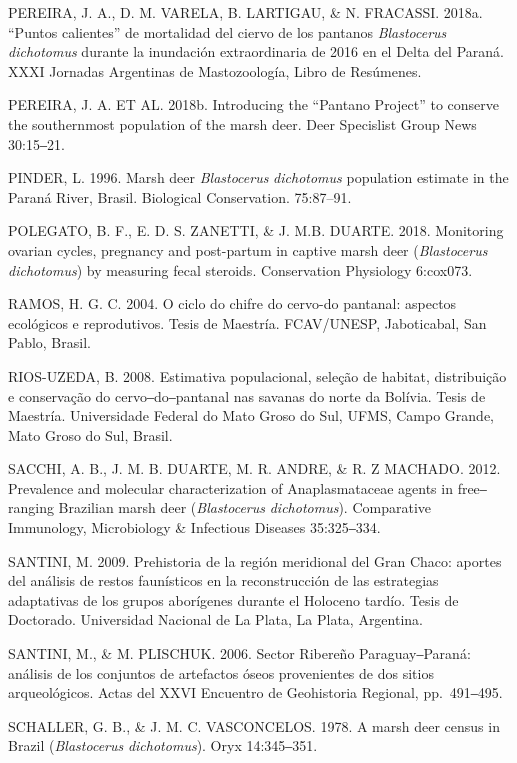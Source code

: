 \documentclass[
  x11names]{article}
\begin{document}
PEREIRA, J. A., D. M. VARELA, B. LARTIGAU, \& N. FRACASSI. 2018a.
``Puntos calientes'' de mortalidad del ciervo de los pantanos
\textit{Blastocerus} \textit{dichotomus} durante la inundación
extraordinaria de 2016 en el Delta del Paraná. XXXI Jornadas Argentinas
de Mastozoología, Libro de Resúmenes.

PEREIRA, J. A. ET AL. 2018b. Introducing the ``Pantano Project'' to
conserve the southernmost population of the marsh deer. Deer Specislist
Group News 30:15‒21.

PINDER, L. 1996. Marsh deer \textit{Blastocerus} \textit{dichotomus}
population estimate in the Paraná River, Brasil. Biological
Conservation. 75:87--91.

POLEGATO, B. F., E. D. S. ZANETTI, \& J. M.B. DUARTE. 2018. Monitoring
ovarian cycles, pregnancy and post-partum in captive marsh deer
(\textit{Blastocerus} \textit{dichotomus}) by measuring fecal steroids.
Conservation Physiology 6:cox073.

RAMOS, H. G. C. 2004. O ciclo do chifre do cervo-do pantanal: aspectos
ecológicos e reprodutivos. Tesis de Maestría. FCAV/UNESP, Jaboticabal,
San Pablo, Brasil.

RIOS-UZEDA, B. 2008. Estimativa populacional, seleção de habitat,
distribuição e conservação do cervo‒do‒pantanal nas savanas do norte da
Bolívia. Tesis de Maestría. Universidade Federal do Mato Groso do Sul,
UFMS, Campo Grande, Mato Groso do Sul, Brasil.

SACCHI, A. B., J. M. B. DUARTE, M. R. ANDRE, \& R. Z MACHADO. 2012.
Prevalence and molecular characterization of Anaplasmataceae agents in
free‒ranging Brazilian marsh deer (\textit{Blastocerus}
\textit{dichotomus}). Comparative Immunology, Microbiology \& Infectious
Diseases 35:325‒334.

SANTINI, M. 2009. Prehistoria de la región meridional del Gran Chaco:
aportes del análisis de restos faunísticos en la reconstrucción de las
estrategias adaptativas de los grupos aborígenes durante el Holoceno
tardío. Tesis de Doctorado. Universidad Nacional de La Plata, La Plata,
Argentina.

SANTINI, M., \& M. PLISCHUK. 2006. Sector Ribereño Paraguay‒Paraná:
análisis de los conjuntos de artefactos óseos provenientes de dos sitios
arqueológicos. Actas del XXVI Encuentro de Geohistoria Regional,
pp.~491‒495.

SCHALLER, G. B., \& J. M. C. VASCONCELOS. 1978. A marsh deer census in
Brazil (\textit{Blastocerus} \textit{dichotomus}). Oryx 14:345‒351.
\end{document}
